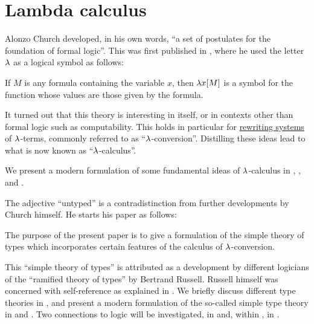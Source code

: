 \chapter{Lambda calculus}\label{ch:lambda_calculus}

Alonzo Church developed, in his own words, \enquote{a set of postulates for the foundation of formal logic}. This was first published in \cite{Church1932LambdaCalculus}, where he used the letter \( \mathrm{\lambda} \) as a logical symbol as follows:
\begin{displayquote}
  If \( M \) is any formula containing the variable \( x \), then \( \mathrm{\lambda} x [M] \) is a symbol for the function whose values are those given by the formula.
\end{displayquote}

It turned out that this theory is interesting in itself, or in contexts other than formal logic such as computability. This holds in particular for \hyperref[def:rewriting_system]{rewriting systems} of \( \mathrm{\lambda} \)-terms, commonly referred to as \enquote{\( \mathrm{\lambda} \)-conversion}. Distilling these ideas lead to what is now known as \enquote{\( \mathrm{\lambda} \)-calculus}.

We present a modern formulation of some fundamental ideas of \( \mathrm{\lambda} \)-calculus in , ,  and .

The adjective \enquote{untyped} is a contradistinction from further developments by Church himself. He starts his paper \cite{Church1940STT} as follows:
\begin{displayquote}
  The purpose of the present paper is to give a formulation of the simple theory of types which incorporates certain features of the calculus of \( \mathrm{\lambda} \)-conversion.
\end{displayquote}

This \enquote{simple theory of types} is attributed as a development by different logicians of the \enquote{ramified theory of types} by Bertrand Russell. Russell himself was concerned with self-reference as explained in . We briefly discuss different type theories in , and present a modern formulation of the so-called simple type theory in  and . Two connections to logic will be investigated, in  and, within , in .
